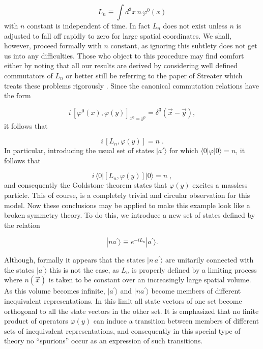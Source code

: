 \documentclass[%
  12pt,
  paper=letter,
  abstracton,
  pagesize=auto,
  version=last,
  DIV=calc
  ]{article}
\begin{document}
\begin{equation*}
L_n\equiv \int d^3x \,n \,\varphi^{0}(x)
\end{equation*}
with $n$ constant is independent of time.  In fact $L_n$ does not
exist unless $n$ is adjusted to fall off rapidly to zero for large
spatial coordinates.  We shall, however, proceed formally with $n$
constant, as ignoring this subtlety does not get us into any
difficulties.  Those who object to this procedure may find comfort
either by noting that all our results are derived by considering well
defined commutators of $L_n$ or better still be referring to the paper
of Streater which treats these problems rigorously \cite{11}.  Since
the canonical commutation relations have the form

\begin{equation*}
i\, [\varphi^{0} (x), \varphi(y)]_{x^{0}=y^{0}} =  \delta^3(\vec{x} - \vec{y}),
\end{equation*}
it follows that

\begin{equation*}
i\, [L_n, \varphi(y)] = n \; .
\end{equation*}
In particular, introducing the usual set of states $|a'\rangle$ for which
$\langle 0|\varphi|0\rangle = n$, it follows that

\begin{equation*}
i\, \langle 0|[L_n, \varphi(y)]|0\rangle = n \; ,
\end{equation*}
and consequently the Goldstone theorem states that $\varphi(y)$
excites a massless particle.  This of course, is a completely trivial
and circular observation for this model.  Now these conclusions may be
applied to make this example look like a broken symmetry theory.  To
do this, we introduce a new set of states defined by the relation

\begin{equation*}
|n a^{\prime}\rangle \equiv e^{-i L_n} |a^{\prime}\rangle.
\end{equation*}

Although, formally it appears that the states $|n\, a^{\prime}\rangle$ are
unitarily connected with the states $|a^{\prime}\rangle$ this is not the
case, as $L_n$ is properly defined by a limiting process where
$n(\vec{x})$ is taken to be constant over an increasingly large
spatial volume.  As this volume becomes infinite, $|a^{\prime}\rangle$ and $|
n a^{\prime}\rangle$ become members of different inequivalent
representations.  In this limit all state vectors of one set become
orthogonal to all the state vectors in the other set.  It is
emphasized that no finite product of operators $\varphi(y)$ can induce
a transition between members of different sets of inequivalent
representations, and consequently in this special type of theory no
``spurions'' occur as an expression of such transitions.
\end{document}
